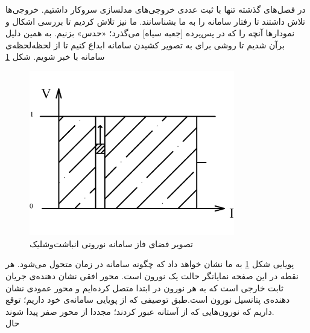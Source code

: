 در فصل‌های گذشته تنها با ثبت عددی خروجی‌های مدلسازی سروکار داشتیم. خروجی‌ها تلاش داشتند تا رفتار سامانه را به ما بشناسانند. ما نیز تلاش کردیم تا بررسی اشکال و نمودارها آنچه را که در پس‌پرده [جعبه سیاه] می‌گذرد؛ «حدس» بزنیم. به همین دلیل برآن شدیم تا روشی برای به تصویر کشیدن سامانه ابداع کنیم تا از لحظه‌لحظه‌ی سامانه با خبر شویم. شکل \ref{fig:if_animation_plot}

\begin{figure}[h]
	\centering
	\includegraphics[width =0.8\textwidth]{../papers_studies/figs/IF/IF_phase_space-Model.png}
	\caption{تصویر فضای فاز سامانه نورونی انباشت‌وشلیک}
	\label{fig:if_animation_plot}
\end{figure}

پویایی شکل \ref{fig:if_animation_plot} به ما نشان خواهد داد که چگونه سامانه در زمان متحول می‌شود. هر نقطه در این صفحه نمایانگر حالت یک نورون است. محور افقی نشان دهنده‌ی جریان ثابت خارجی است که به هر نورون در ابتدا متصل کرده‌ایم و محور عمودی نشان دهنده‌ی پتانسیل نورون است.طبق توصیفی که از پویایی سامانه‌ی خود داریم؛ توقع داریم که نورون‌هایی که از آستانه عبور کردند؛ مجددا از محور صفر پیدا شوند.\\

حال 
